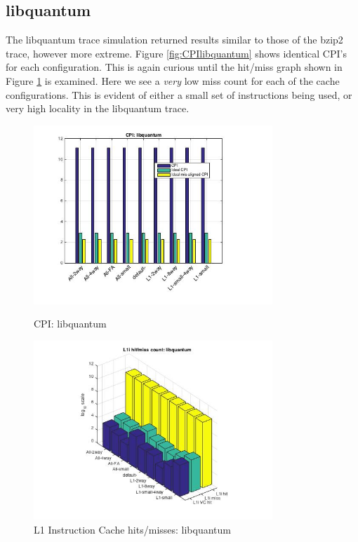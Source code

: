 \documentclass[11pt,titlepage]{article}
\begin{document}
    \subsection{libquantum}
    The libquantum trace simulation returned results similar to those of the bzip2 trace, however more extreme. Figure \ref{fig:CPIlibquantum} shows identical CPI's for each configuration. This is again curious until the hit/miss graph shown in Figure \ref{fig:L1IHM_libquantum} is examined. Here we see  a \emph{very} low miss count for each of the cache configurations. This is evident of either a small set of instructions being used, or very high locality in the libquantum trace. 
        \begin{figure}[H]
          \centering
          \begin{minipage}{.45\textwidth}
             \includegraphics[width=9cm]{CPIlibquantum}
             \caption{CPI: libquantum}
      	     \label{fig:CPIlibquantum}
          \end{minipage}
          \begin{minipage}{.45\textwidth}
              \includegraphics[width=9cm]{L1IHM_libquantum}
              \caption{L1 Instruction Cache hits/misses: libquantum}
              \label{fig:L1IHM_libquantum}
          \end{minipage}%
          \end{figure}
\end{document}
